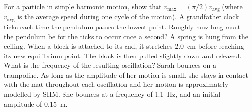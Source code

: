 \documentclass[a4paper]{exam}
\begin{document}
\begin{questions}
    \question For a particle in simple harmonic motion, show that $ v_\text{max} = (\pi/2) v_{\text{avg}} $ (where $ v_{\text{avg}} $ is
              the average speed during one cycle of the motion).
    \question A grandfather clock ticks each time the pendulum passes the lowest point. Roughly how long must the pendulum be for
              the ticks to occur once a second?
    \question A spring is hung from the ceiling. When a block is attached to its end, it stretches \SI{2.0}{\centi\metre} before
              reaching its new equilibrium point. The block is then pulled slightly down and released. What is the frequency of the
              resulting oscillation?
    \question Sarah bounces on a trampoline. As long as the amplitude of her motion is small, she stays in contact with the mat throughout
              each oscillation and her motion is approximately modelled by SHM. She bounces at a frequency of \SI{1.1}{\hertz}, and an
              initial amplitude of \SI{0.15}{\metre}.
\end{questions}
\end{document}
